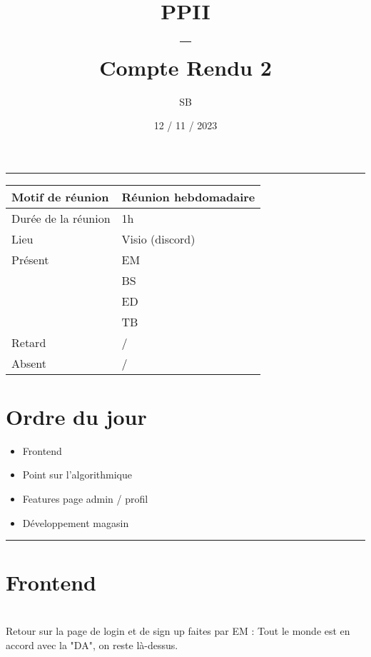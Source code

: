 \documentclass[10pt,a4paper]{report}
\title{PPII \\ -- \\ Compte Rendu 2}
\date{12 / 11 / 2023}
\author{SB}
\begin{document}
\maketitle

\tableofcontents \bigskip

\rule{\linewidth}{0.5mm} \bigskip

                \begin{tabular}{|l | l|}
                        \hline
                Motif de réunion & Réunion hebdomadaire \\
                        \hline
                Durée de la réunion & 1h \\
                        \hline
                Lieu & Visio (discord) \\
                        \hline
                Présent & EM \\
                        & BS \\
                        & ED \\
                        & TB  \\
                        \hline
                Retard  & / \\
                        \hline
                Absent  & / \\
                        \hline
                \end{tabular}


\section{Ordre du jour}
\begin{itemize}
        \item Frontend
        \item Point sur l'algorithmique
        \item Features page admin / profil
        \item Développement magasin
\end{itemize}

\rule{\linewidth}{0.5mm} \bigskip
\section{Frontend}
\ \\

Retour sur la page de login et de sign up faites par EM : Tout le monde est en accord avec la "DA", on reste là-dessus. \\
\end{document}
